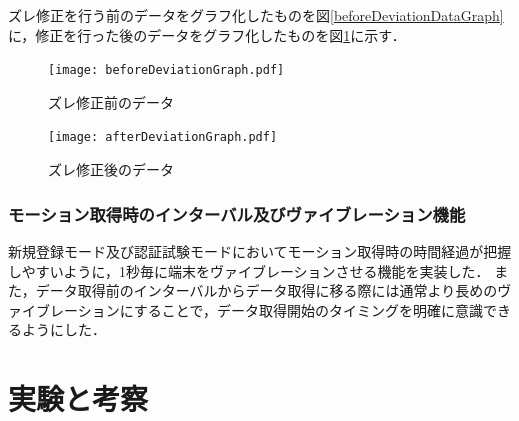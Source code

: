 \documentclass[12pt]{jreport}
\begin{document}
        ズレ修正を行う前のデータをグラフ化したものを図\ref{beforeDeviationDataGraph}に，修正を行った後のデータをグラフ化したものを図\ref{afterDeviationDataGraph}に示す．

        \begin{figure}[hbpt]
            \begin{minipage}{0.5\hsize}
                \begin{center}
                    \texttt{[image: beforeDeviationGraph.pdf]}
                \end{center}
                \caption{ズレ修正前のデータ}
                \label{beforeDeviationDataGraph}
            \end{minipage}
            \begin{minipage}{0.5\hsize}
                \begin{center}
                    \texttt{[image: afterDeviationGraph.pdf]}
                \end{center}
                \caption{ズレ修正後のデータ}
                \label{afterDeviationDataGraph}
            \end{minipage}
        \end{figure}

        \subsection{モーション取得時のインターバル及びヴァイブレーション機能}
        新規登録モード及び認証試験モードにおいてモーション取得時の時間経過が把握しやすいように，1秒毎に端末をヴァイブレーションさせる機能を実装した．
        また，データ取得前のインターバルからデータ取得に移る際には通常より長めのヴァイブレーションにすることで，データ取得開始のタイミングを明確に意識できるようにした．

\chapter{実験と考察}
\end{document}
